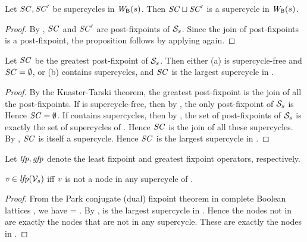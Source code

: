 \begin{proposition} \label{prop:supercycle:union}
Let $\mathit{SC}, \mathit{SC}'$ be supercycles in $\mathit{W}_{\mathsf{B}}({s})$. Then $\mathit{SC} \sqcup \mathit{SC}'$ is
a supercycle in $\mathit{W}_{\mathsf{B}}({s})$.
\end{proposition}
%
\begin{proof}
By , $\mathit{SC}$ and $\mathit{SC}'$ are post-fixpoints of $\mathcal{S}_s$. Since the join of post-fixpoints is a post-fixpoint, 
the proposition follows by applying  again.
\end{proof}




\begin{proposition} \label{prop:GFPisLargestSC}
Let $\mathit{SC}$ be the greatest post-fixpoint of $\mathcal{S}_s$. Then either
(a)  is supercycle-free and $\mathit{SC} = \emptyset$, or 
(b)  contains supercycles, and $\mathit{SC}$ is the largest supercycle in .
\end{proposition}
%
\begin{proof}
By the Knaster-Tarski theorem, the greatest post-fixpoint is the join of all the post-fixpoints. 
If  is supercycle-free, then by , the only post-fixpoint of $\mathcal{S}_s$ is \ewfg
Hence $\mathit{SC} = \emptyset$.
If  contains supercycles, then by ,  the set of post-fixpoints of $\mathcal{S}_s$ is exactly the set of 
supercycles of . Hence $\mathit{SC}$ is the join of all these supercycles. By , $\mathit{SC}$ is itself a supercycle.
Hence $\mathit{SC}$ is the largest supercycle in .
\end{proof}

Let $\mathit{lfp}, \mathit{gfp}$ denote the least fixpoint and greatest fixpoint operators, respectively.

\begin{proposition}  \label{prop:LFPisScViolations}
$\mathit{v} \in  \mathit{lfp}(\mathcal{V}_s)$ iff $\mathit{v}$ is not a node in any supercycle of .    
\end{proposition}
%
\begin{proof}
From the Park conjugate (dual) fixpoint theorem in complete Boolean
lattices \cite{Pa69}, we have 
 = .
By ,  is the largest supercycle in . Hence the nodes not in 
 are exactly the nodes that are not in any supercycle. These are exactly the nodes in .
\end{proof}

